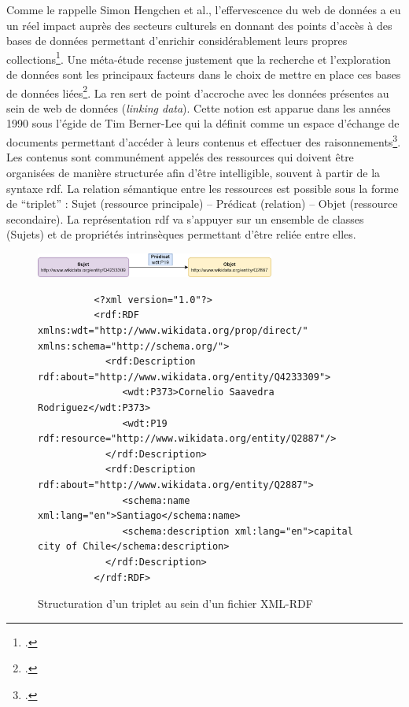 	Comme le rappelle Simon Hengchen et al., l'effervescence du web de données a eu un réel impact auprès des secteurs culturels en donnant des points d'accès à des bases de données permettant d'enrichir considérablement leurs propres collections\footcite{hengchenExtractionEntitesNommees2015}. Une méta-étude recense justement que la recherche et l'exploration de données sont les principaux facteurs dans le choix de mettre en place ces bases de données liées\footcite{davisLinkedDataCultural2021}. La \gls{ren} sert de point d'accroche avec les données présentes au sein de web de données (\textit{linking data}). Cette notion est apparue dans les années 1990 sous l'égide de Tim Berner-Lee qui la définit comme un espace d'échange de documents permettant d'accéder à leurs contenus et effectuer des raisonnements\footcite{berners-leeSemanticWeb2001}. Les contenus sont communément appelés des ressources qui doivent être organisées de manière structurée afin d'être intelligible, souvent à partir de la syntaxe \gls{rdf}.  La relation sémantique entre les ressources est possible sous la forme de \enquote{triplet} : Sujet (ressource principale) -- Prédicat (relation) -- Objet (ressource secondaire). La représentation \gls{rdf} va s'appuyer sur un ensemble de classes (Sujets) et de propriétés intrinsèques permettant d'être reliée entre elles.
	
	\begin{figure}[H]
	\centering
    \includegraphics[width=0.7\textwidth]{annexes/schema/triplet.png}
    \begin{verbatim}
          <?xml version="1.0"?>
          <rdf:RDF xmlns:wdt="http://www.wikidata.org/prop/direct/" xmlns:schema="http://schema.org/">
            <rdf:Description rdf:about="http://www.wikidata.org/entity/Q4233309">
               <wdt:P373>Cornelio Saavedra Rodriguez</wdt:P373>
               <wdt:P19 rdf:resource="http://www.wikidata.org/entity/Q2887"/>
            </rdf:Description>
            <rdf:Description rdf:about="http://www.wikidata.org/entity/Q2887">
               <schema:name xml:lang="en">Santiago</schema:name>
               <schema:description xml:lang="en">capital city of Chile</schema:description>
            </rdf:Description>
          </rdf:RDF>
        \end{verbatim}
      \caption{Structuration d'un triplet au sein d'un fichier XML-RDF}
      \label{fig:triplet}
    \end{figure}
	
